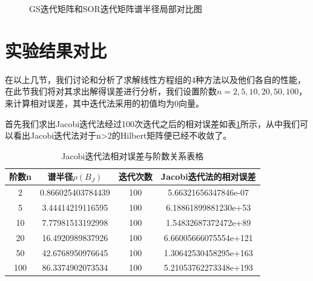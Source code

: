 \documentclass[a4paper]{article}
\begin{document}
\begin{figure}[!h] \centering 
	\caption{GS迭代矩阵和SOR迭代矩阵谱半径局部对比图} 
	\label{fig:8} 
\end{figure}

\section{实验结果对比}
在以上几节，我们讨论和分析了求解线性方程组的4种方法以及他们各自的性能，在此节我们将对其求出解得误差进行分析，我们设置阶数$n=2,5,10,20,50,100$，来计算相对误差，其中迭代法采用的初值均为0向量。

首先我们求出Jacobi迭代法经过100次迭代之后的相对误差如表\ref{tab:table3}所示，从中我们可以看出Jacobi迭代法对于n>2的Hilbert矩阵便已经不收敛了。

\begin{table}[htbp]
	\centering
	\caption{Jacobi迭代法相对误差与阶数关系表格}
	\label{tab:table3}
	\begin{tabular}{|c|c|c|c|}
		\hline
		阶数n & 谱半径$\rho(B_J)$& 迭代次数 &Jacobi迭代法的相对误差 \\
		\hline
		2 &0.866025403784439 &100 & 5.66321656347846e-07\\
		\hline
		5 &3.44414219116595 &100 & 6.18861899881230e+53\\
		\hline
		10 &7.77981513192998 &100 & 1.54832687372472e+89\\
		\hline
		20 &16.4920989837926 &100 & 6.66005666075554e+121\\
		\hline
		50 &42.6768950976645 &100 & 1.30642530458295e+163\\
		\hline
		100 &86.3374902073534 &100 & 5.21053762273348e+193\\
		\hline
	\end{tabular}
\end{table}
\end{document}
